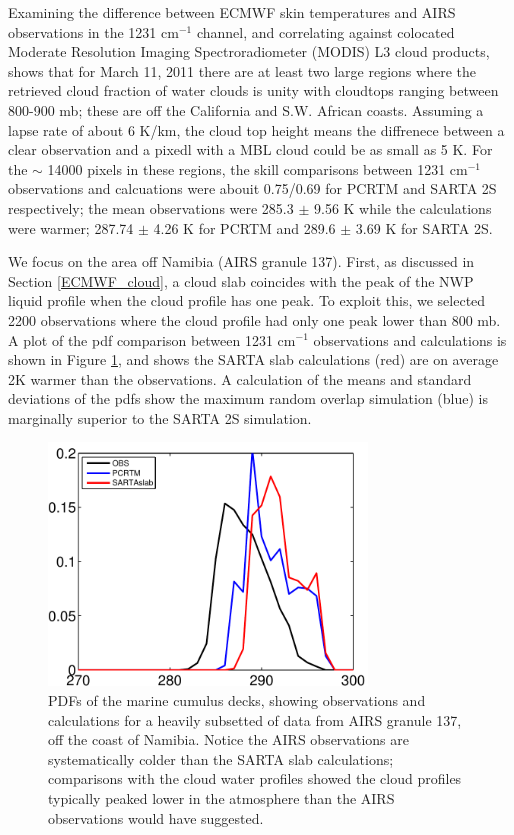 \documentclass[agupp]{aguplus}              %
\newcommand{\wn}{cm$^{-1}$\xspace}
\begin{document}
\begin{article}
Examining the difference between ECMWF skin temperatures and AIRS observations in the
1231 \wn channel, and correlating against colocated Moderate Resolution
Imaging Spectroradiometer (MODIS) L3 cloud products, shows that for March 11, 2011
there are at least two large regions where the retrieved cloud fraction of water clouds
is unity with cloudtops ranging between 800-900 mb; these are off the California and
S.W. African coasts. Assuming a lapse
rate of about 6 K/km, the cloud top height means the diffrenece
between a clear observation and a pixedl with a MBL cloud could be as
small as 5 K. For the $\sim$ 14000 pixels in these regions, the
skill comparisons between 1231 \wn observations and calcuations were
abouit 0.75/0.69 for PCRTM and SARTA 2S respectively; the mean
observations were 285.3 $\pm$ 9.56 K while the calculations were
warmer; 287.74 $\pm$ 4.26 K for PCRTM and 289.6 $\pm$ 3.69 K for SARTA
2S.

We focus on the area off Namibia (AIRS granule 137). First, as
discussed in Section \ref{ECMWF_cloud}, a cloud slab coincides with
the peak of the NWP liquid profile when the cloud profile has one
peak. To exploit this, we selected 2200 observations where the cloud
profile had only one peak lower than 800 mb. A plot of the pdf
comparison between 1231 \wn observations and calculations is shown in
Figure \ref{marine_pdf_zoom}, and shows the SARTA slab calculations
(red) are on average 2K warmer than the observations. A calculation of
the means and standard deviations of the pdfs show the maximum random
overlap simulation (blue) is marginally superior to the SARTA 2S
simulation.

\begin{figure}[h]
\noindent\includegraphics[width=20pc]{FIGS/ecm_cloudBT1231_gev_marine_zoom}
\caption{PDFs of the marine cumulus decks, showing observations and
calculations for a heavily subsetted of data from AIRS granule 137,
off the coast of Namibia. Notice the AIRS observations are
systematically colder than the SARTA slab calculations; comparisons
with the cloud water profiles showed the cloud profiles typically
peaked lower in the atmosphere than the AIRS observations would have
suggested.}
\label{marine_pdf_zoom} 
\end{figure}


\end{article}
\end{document}

